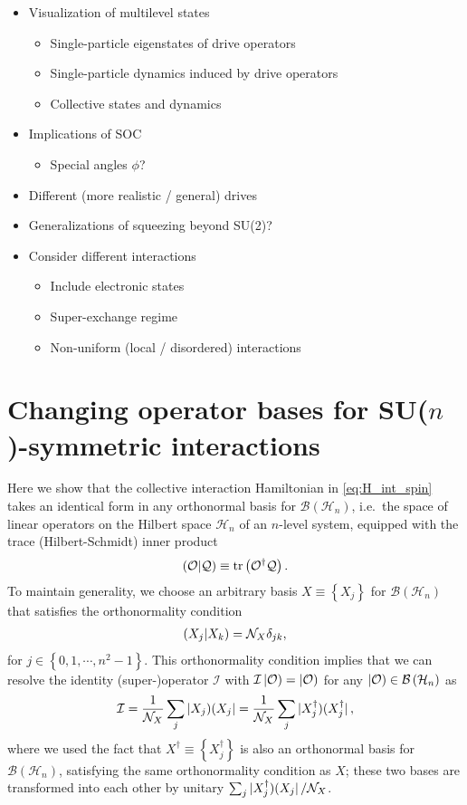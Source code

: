\documentclass[nofootinbib,notitlepage,11pt]{revtex4-2}
\newcommand{\f}[2]{\dfrac{#1}{#2}} %
\newcommand{\p}[1]{\left(#1\right)} %
\renewcommand{\set}[1]{\left\{#1\right\}} %
\newcommand{\1}{\mathds{1}}
\newcommand{\B}{\mathcal{B}}
\renewcommand{\H}{\mathcal{H}}
\newcommand{\I}{\mathcal{I}}
\newcommand{\N}{\mathcal{N}}
\renewcommand{\O}{\mathcal{O}}
\newcommand{\Q}{\mathcal{Q}}
\def\obra#1{\mathinner{({#1}|}}
\def\oket#1{\mathinner{|{#1})}}
\def\obk#1{\mathinner{({#1})}}
\def\oop#1#2{\oket{#1}\!\obra{#2}}
\begin{document}
\begin{itemize}
\item Visualization of multilevel states
  \begin{itemize}
  \item Single-particle eigenstates of drive operators
  \item Single-particle dynamics induced by drive operators
  \item Collective states and dynamics
  \end{itemize}
\item Implications of SOC
  \begin{itemize}
  \item Special angles $\phi$?
  \end{itemize}
\item Different (more realistic / general) drives
\item Generalizations of squeezing beyond SU(2)?
\item Consider different interactions
  \begin{itemize}
  \item Include electronic states
  \item Super-exchange regime
  \item Non-uniform (local / disordered) interactions
  \end{itemize}
\end{itemize}

\appendix

\section{Changing operator bases for SU($n$)-symmetric interactions}
\label{sec:changing_bases}

Here we show that the collective interaction Hamiltonian in
\eqref{eq:H_int_spin} takes an identical form in any orthonormal basis
for $\B\p{\H_n}$, i.e.~the space of linear operators on the Hilbert
space $\H_n$ of an $n$-level system, equipped with the trace
(Hilbert-Schmidt) inner product
\begin{align}
  \obk{\O|\Q} \equiv \tr\p{\O^\dag \Q}.
\end{align}
To maintain generality, we choose an arbitrary basis
$X\equiv\set{X_j}$ for $\B\p{\H_n}$ that satisfies the orthonormality
condition
\begin{align}
  \obk{X_j|X_k} = \N_X \delta_{jk},
\end{align}
for $j\in\set{0,1,\cdots,n^2-1}$.  This orthonormality condition
implies that we can resolve the identity (super-)operator $\I$ with
$\I\oket{\O}=\oket{\O}$ for any $\oket\O\in\B\p{\H_n}$ as
\begin{align}
  \I = \f1{\N_X} \sum_j \oop{X_j}{X_j}
  = \f1{\N_X} \sum_j \oop{X_j^\dag}{X_j^\dag},
\end{align}
where we used the fact that $X^\dag\equiv\set{X_j^\dag}$ is also an
orthonormal basis for $\B\p{\H_n}$, satisfying the same orthonormality
condition as $X$; these two bases are transformed into each other by
unitary $\sum_j\oop{X_j^\dag}{X_j}/\N_X$.
\end{document}
